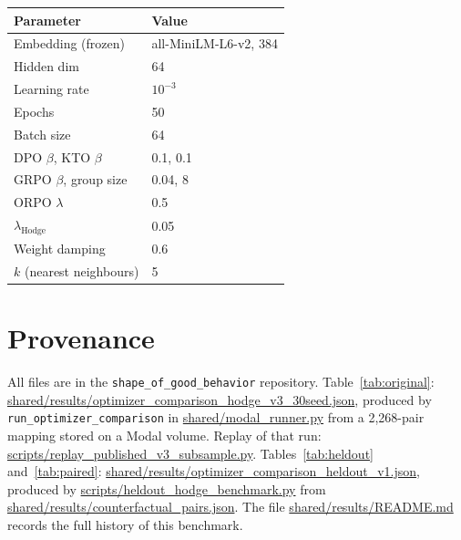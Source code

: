 \documentclass{article}
\begin{document}
\begin{table}[h]
\centering
\begin{tabular}{@{}ll@{}}
\toprule
\textbf{Parameter} & \textbf{Value} \\
\midrule
Embedding (frozen) & all-MiniLM-L6-v2, 384 \\
Hidden dim & 64 \\
Learning rate & $10^{-3}$ \\
Epochs & 50 \\
Batch size & 64 \\
DPO $\beta$, KTO $\beta$ & 0.1, 0.1 \\
GRPO $\beta$, group size & 0.04, 8 \\
ORPO $\lambda$ & 0.5 \\
$\lambda_\text{Hodge}$ & 0.05 \\
Weight damping & 0.6 \\
$k$ (nearest neighbours) & 5 \\
\bottomrule
\end{tabular}
\end{table}

\section{Provenance}
\label{app:provenance}

{\sloppy
All files are in the \texttt{shape\_of\_good\_behavior} repository. Table~\ref{tab:original}: \url{shared/results/optimizer_comparison_hodge_v3_30seed.json}, produced by \texttt{run\_optimizer\_comparison} in \url{shared/modal_runner.py} from a 2,268-pair mapping stored on a Modal volume. Replay of that run: \url{scripts/replay_published_v3_subsample.py}. Tables~\ref{tab:heldout} and~\ref{tab:paired}: \url{shared/results/optimizer_comparison_heldout_v1.json}, produced by \url{scripts/heldout_hodge_benchmark.py} from \url{shared/results/counterfactual_pairs.json}. The file \url{shared/results/README.md} records the full history of this benchmark.\par}
\end{document}
